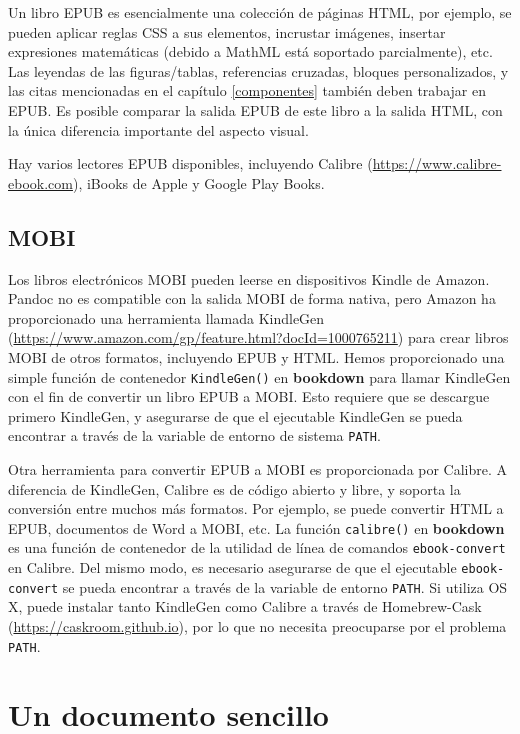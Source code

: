 \documentclass[12pt,]{krantz}
\theoremstyle{definition}
\theoremstyle{definition}
\theoremstyle{definition}
\theoremstyle{remark}
\begin{document}
Un libro EPUB es esencialmente una colección de páginas HTML, por
ejemplo, se pueden aplicar reglas CSS a sus elementos, incrustar
imágenes, insertar expresiones matemáticas (debido a MathML está
soportado parcialmente), etc. Las leyendas de las figuras/tablas,
referencias cruzadas, bloques personalizados, y las citas mencionadas en
el capítulo \ref{componentes} también deben trabajar en EPUB. Es posible
comparar la salida EPUB de este libro a la salida HTML, con la única
diferencia importante del aspecto visual.

Hay varios lectores EPUB disponibles, incluyendo Calibre
(\url{https://www.calibre-ebook.com}), iBooks de Apple y Google Play
Books.

\subsection{MOBI}\label{mobi}

Los libros electrónicos MOBI pueden leerse en dispositivos Kindle de
Amazon. Pandoc no es compatible con la salida MOBI de forma nativa, pero
Amazon ha proporcionado una herramienta llamada KindleGen
(\url{https://www.amazon.com/gp/feature.html?docId=1000765211}) para
crear libros MOBI de otros formatos, incluyendo EPUB y HTML. Hemos
proporcionado una simple función de contenedor \texttt{KindleGen()} en
\textbf{bookdown} para llamar KindleGen con el fin de convertir un libro
EPUB a MOBI. Esto requiere que se descargue primero KindleGen, y
asegurarse de que el ejecutable KindleGen se pueda encontrar a través de
la variable de entorno de sistema \texttt{PATH}.

Otra herramienta para convertir EPUB a MOBI es proporcionada por
Calibre. A diferencia de KindleGen, Calibre es de código abierto y
libre, y soporta la conversión entre muchos más formatos. Por ejemplo,
se puede convertir HTML a EPUB, documentos de Word a MOBI, etc. La
función \texttt{calibre()} en \textbf{bookdown} es una función de
contenedor de la utilidad de línea de comandos \texttt{ebook-convert} en
Calibre. Del mismo modo, es necesario asegurarse de que el ejecutable
\texttt{ebook-convert} se pueda encontrar a través de la variable de
entorno \texttt{PATH}. Si utiliza OS X, puede instalar tanto KindleGen
como Calibre a través de Homebrew-Cask
(\url{https://caskroom.github.io}), por lo que no necesita preocuparse
por el problema \texttt{PATH}.

\hypertarget{un-documento-sencillo}{\section{Un documento
sencillo}\label{un-documento-sencillo}}
\end{document}
